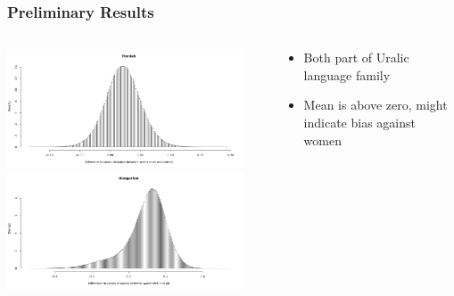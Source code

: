 \documentclass[handout]{beamer}
\begin{document}
\begin{frame}
    \frametitle{Preliminary Results}
    \begin{columns}[T]
        \begin{column}{6cm}
            \includegraphics[width=7cm]{images/fi_hist.png}
            \includegraphics[width=7cm]{images/hu_hist.png}
        \end{column}
        \begin{column}{6cm}
            \begin{itemize}
                \item Both part of Uralic language family
                \item Mean is above zero, might indicate bias against women
            \end{itemize}
        \end{column}
    \end{columns}
\end{frame}
\end{document}

